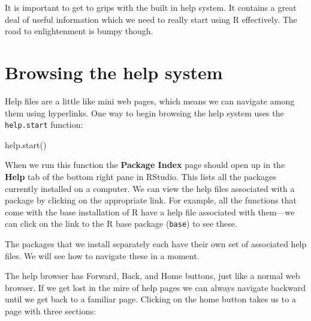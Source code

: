 \documentclass[
]{book}
\newenvironment{Shaded}{\begin{snugshade}}{\end{snugshade}}
\newcommand{\FunctionTok}[1]{\textcolor[rgb]{0.00,0.00,0.00}{#1}}
\newcommand{\NormalTok}[1]{#1}
\begin{document}
It is important to get to grips with the built in help system. It contains a great deal of useful information which we need to really start using R effectively. The road to enlightenment is bumpy though.

\hypertarget{browsing-the-help-system}{%
\section{Browsing the help system}\label{browsing-the-help-system}}

Help files are a little like mini web pages, which means we can navigate among them using hyperlinks. One way to begin browsing the help system uses the \texttt{help.start} function:

\begin{Shaded}
\begin{Highlighting}[]
\FunctionTok{help.start}\NormalTok{() }
\end{Highlighting}
\end{Shaded}

When we run this function the \textbf{Package Index} page should open up in the \textbf{Help} tab of the bottom right pane in RStudio. This lists all the packages currently installed on a computer. We can view the help files associated with a package by clicking on the appropriate link. For example, all the functions that come with the base installation of R have a help file associated with them---we can click on the link to the R base package (\texttt{base}) to see these.

The packages that we install separately each have their own set of associated help files. We will see how to navigate these in a moment.

The help browser has Forward, Back, and Home buttons, just like a normal web browser. If we get lost in the mire of help pages we can always navigate backward until we get back to a familiar page. Clicking on the home button takes us to a page with three sections:
\end{document}
